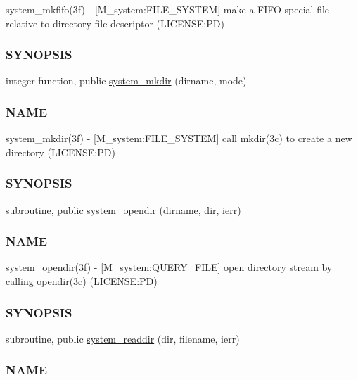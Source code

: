 \begin{DoxyCompactItemize}
\begin{DoxyCompactList}
system\+\_\+mkfifo(3f) -\/ \mbox{[}M\+\_\+system\+:F\+I\+L\+E\+\_\+\+S\+Y\+S\+T\+EM\mbox{]} make a F\+I\+FO special file relative to directory file descriptor (L\+I\+C\+E\+N\+SE\+:PD) \subsubsection*{S\+Y\+N\+O\+P\+S\+IS}\end{DoxyCompactList}\item 
integer function, public \mbox{\hyperlink{namespacem__system_a084d644c236d22af2cc75c6e48fd6e96}{system\+\_\+mkdir}} (dirname, mode)
\begin{DoxyCompactList}\small\item\em \subsubsection*{N\+A\+ME}

system\+\_\+mkdir(3f) -\/ \mbox{[}M\+\_\+system\+:F\+I\+L\+E\+\_\+\+S\+Y\+S\+T\+EM\mbox{]} call mkdir(3c) to create a new directory (L\+I\+C\+E\+N\+SE\+:PD) \subsubsection*{S\+Y\+N\+O\+P\+S\+IS}\end{DoxyCompactList}\item 
subroutine, public \mbox{\hyperlink{namespacem__system_a622cc67c03e8cdea1d4c2430bb36081b}{system\+\_\+opendir}} (dirname, dir, ierr)
\begin{DoxyCompactList}\small\item\em \subsubsection*{N\+A\+ME}

system\+\_\+opendir(3f) -\/ \mbox{[}M\+\_\+system\+:Q\+U\+E\+R\+Y\+\_\+\+F\+I\+LE\mbox{]} open directory stream by calling opendir(3c) (L\+I\+C\+E\+N\+SE\+:PD) \subsubsection*{S\+Y\+N\+O\+P\+S\+IS}\end{DoxyCompactList}\item 
subroutine, public \mbox{\hyperlink{namespacem__system_a983df5b2d7cb5842d69c4a31829403e0}{system\+\_\+readdir}} (dir, filename, ierr)
\begin{DoxyCompactList}\small\item\em \subsubsection*{N\+A\+ME}


\end{DoxyCompactList}
\end{DoxyCompactItemize}
